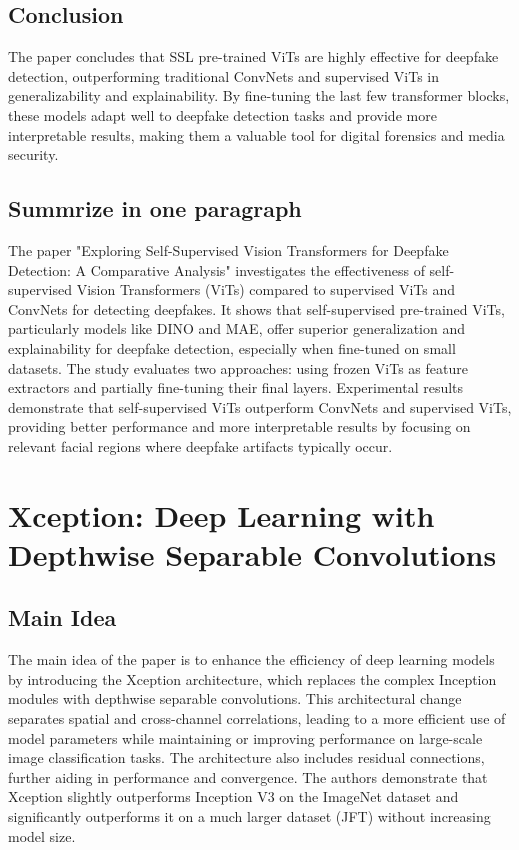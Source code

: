 \documentclass{report}
\begin{document}
	\section{Conclusion}
	The paper concludes that SSL pre-trained ViTs are highly effective for deepfake detection, outperforming traditional ConvNets and supervised ViTs in generalizability and explainability. By fine-tuning the last few transformer blocks, these models adapt well to deepfake detection tasks and provide more interpretable results, making them a valuable tool for digital forensics and media security.
	
	
	\section{Summrize in one paragraph}
	The paper "Exploring Self-Supervised Vision Transformers for Deepfake Detection: A Comparative Analysis" investigates the effectiveness of self-supervised Vision Transformers (ViTs) compared to supervised ViTs and ConvNets for detecting deepfakes. It shows that self-supervised pre-trained ViTs, particularly models like DINO and MAE, offer superior generalization and explainability for deepfake detection, especially when fine-tuned on small datasets. The study evaluates two approaches: using frozen ViTs as feature extractors and partially fine-tuning their final layers. Experimental results demonstrate that self-supervised ViTs outperform ConvNets and supervised ViTs, providing better performance and more interpretable results by focusing on relevant facial regions where deepfake artifacts typically occur.
	
	
	
	
	
	
	
	
	
	
	
	
	
	
	\chapter{Xception: Deep Learning with Depthwise Separable Convolutions \cite{DBLP:journals/corr/Chollet16a}}
	
	\section{Main Idea}
	The main idea of the paper is to enhance the efficiency of deep learning models by introducing the Xception architecture, which replaces the complex Inception modules with depthwise separable convolutions. This architectural change separates spatial and cross-channel correlations, leading to a more efficient use of model parameters while maintaining or improving performance on large-scale image classification tasks. The architecture also includes residual connections, further aiding in performance and convergence. The authors demonstrate that Xception slightly outperforms Inception V3 on the ImageNet dataset and significantly outperforms it on a much larger dataset (JFT) without increasing model size.
	
\end{document}
